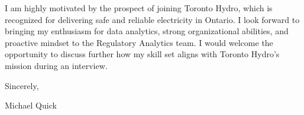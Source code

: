 \documentclass[11pt]{article}
\begin{document}
I am highly motivated by the prospect of joining Toronto Hydro, which is recognized for delivering safe and reliable electricity in Ontario. I look forward to bringing my enthusiasm for data analytics, strong organizational abilities, and proactive mindset to the Regulatory Analytics team. I would welcome the opportunity to discuss further how my skill set aligns with Toronto Hydro’s mission during an interview.

\setlength{\parindent}{0pt}

\vspace{1em}
Sincerely,

\vspace{1em}
Michael Quick
\end{document}
